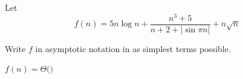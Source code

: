 \begin{prob}
    Let
    \[
        f(n) = 5 n \log n +
        \frac{n^3 + 5}{n + 2 + |\sin \pi n|}
        +
        n \sqrt n
    \]

    Write $f$ in asymptotic notation in as simplest terms possible.

    $f(n) = \Theta($$)$

\end{prob}
